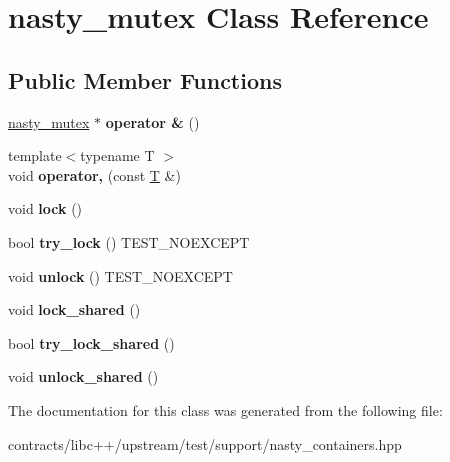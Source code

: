 \hypertarget{classnasty__mutex}{}\section{nasty\+\_\+mutex Class Reference}
\label{classnasty__mutex}
\subsection*{Public Member Functions}
\begin{DoxyCompactItemize}
\item 
\mbox{\label{classnasty__mutex_a5432cf919decf010eb1b22427d35abaf}} 
\mbox{\hyperlink{classnasty__mutex}{nasty\+\_\+mutex}} $\ast$ {\bfseries operator \&} ()
\item 
\mbox{\label{classnasty__mutex_a64559aa91e8f1203c1d55bb6ec01ac6b}} 
{\footnotesize template$<$typename T $>$ }\\void {\bfseries operator,} (const \mbox{\hyperlink{struct_t}{T}} \&)
\item 
\mbox{\label{classnasty__mutex_a57d2d2c6ad560e5ef104e425fdd46ef2}} 
void {\bfseries lock} ()
\item 
\mbox{\label{classnasty__mutex_a2d843101c69322cb46f2e110fc34762f}} 
bool {\bfseries try\+\_\+lock} () T\+E\+S\+T\+\_\+\+N\+O\+E\+X\+C\+E\+PT
\item 
\mbox{\label{classnasty__mutex_a3365851eeecb8ae72bc80715c5e30275}} 
void {\bfseries unlock} () T\+E\+S\+T\+\_\+\+N\+O\+E\+X\+C\+E\+PT
\item 
\mbox{\label{classnasty__mutex_a52df0031f011d14f6797cb2db88e5542}} 
void {\bfseries lock\+\_\+shared} ()
\item 
\mbox{\label{classnasty__mutex_a880443856e13f3a12064190ea132b32f}} 
bool {\bfseries try\+\_\+lock\+\_\+shared} ()
\item 
\mbox{\label{classnasty__mutex_ab623dc98cbda94bdb734595bcd2415db}} 
void {\bfseries unlock\+\_\+shared} ()
\end{DoxyCompactItemize}


The documentation for this class was generated from the following file\+:\begin{DoxyCompactItemize}
\item 
contracts/libc++/upstream/test/support/nasty\+\_\+containers.\+hpp\end{DoxyCompactItemize}
